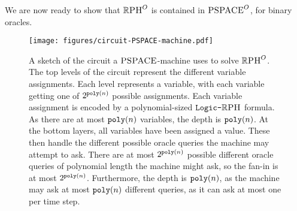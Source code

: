 \documentclass{article}
\begin{document}
We are now ready to show that $\mathbb{R}\textsc{PH}^O$  is contained in $\textsc{PSPACE}^O$, for binary oracles.





\begin{figure}[t]
\centering
\texttt{[image: figures/circuit-PSPACE-machine.pdf]}
\label{fig:my_label}
\caption{
A sketch of the circuit a $\textsc{PSPACE}$-machine uses to solve $\mathbb{R}\textsc{PH}^O$.
The top levels of the circuit represent the different variable assignments.
Each level represents a variable, with each variable getting one of $2^{\texttt{poly}(n)}$ possible assignments.
Each variable assignment is encoded by a polynomial-sized $\texttt{Logic-}\mathbb{R}\textsc{PH}$ formula.
As there are at most $\texttt{poly}(n)$ variables, the depth is $\texttt{poly}(n)$.
At the bottom layers, all variables have been assigned a value.
These then handle the different possible oracle queries the machine may attempt to ask.
There are at most $2^{\texttt{poly}(n)}$ possible different oracle queries of polynomial length the machine might ask, so the fan-in is at most $2^{\texttt{poly}(n)}$.
Furthermore, the depth is $\texttt{poly}(n)$, as the machine may ask at most $\texttt{poly}(n)$ different queries, as it can ask at most one per time step.
}
\end{figure}
\end{document}
